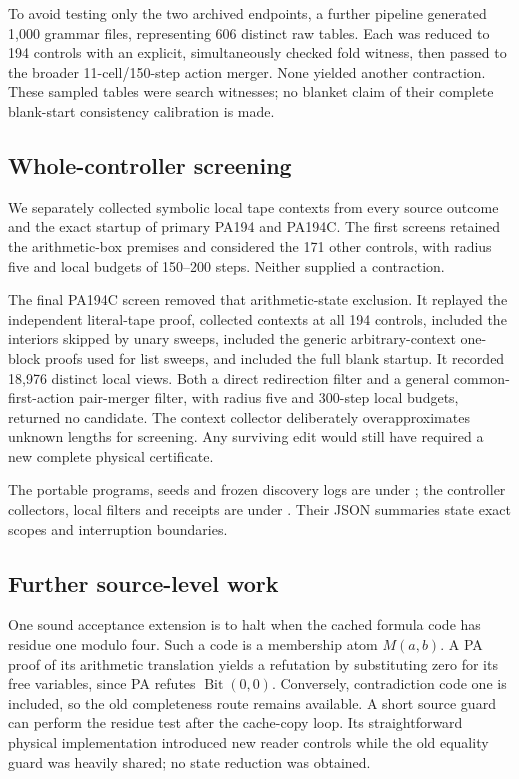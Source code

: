 To avoid testing only the two archived endpoints, a further pipeline
generated 1,000 grammar files, representing 606 distinct raw tables.
Each was reduced to 194 controls with an explicit, simultaneously checked
fold witness, then passed to the broader 11-cell/150-step action merger.
None yielded another contraction. These sampled tables were search
witnesses; no blanket claim of their complete blank-start consistency
calibration is made.

\subsection{Whole-controller screening}

We separately collected symbolic local tape contexts from every source
outcome and the exact startup of primary PA194 and PA194C. The first
screens retained the arithmetic-box premises and considered the 171
other controls, with radius five and local budgets of 150--200 steps.
Neither supplied a contraction.

The final PA194C screen removed that arithmetic-state exclusion. It
replayed the independent literal-tape proof, collected contexts at all
194 controls, included the interiors skipped by unary sweeps, included
the generic arbitrary-context one-block proofs used for list sweeps,
and included the full blank startup. It recorded 18,976 distinct local
views. Both a direct redirection filter and a general common-first-action
pair-merger filter, with radius five and 300-step local budgets, returned
no candidate. The context collector deliberately overapproximates unknown
lengths for screening. Any surviving edit would still have required a
new complete physical certificate.

The portable programs, seeds and frozen discovery logs are under
; the controller collectors, local filters and
receipts are under . Their JSON summaries
state exact scopes and interruption boundaries.

\subsection{Further source-level work}

One sound acceptance extension is to halt when the cached formula code
has residue one modulo four. Such a code is a membership atom $M(a,b)$.
A PA proof of its arithmetic translation yields a refutation by
substituting zero for its free variables, since PA refutes
$\operatorname{Bit}(0,0)$. Conversely, contradiction code one is included,
so the old completeness route remains available. A short source guard
can perform the residue test after the cache-copy loop. Its straightforward
physical implementation introduced new reader controls while the old
equality guard was heavily shared; no state reduction was obtained.

